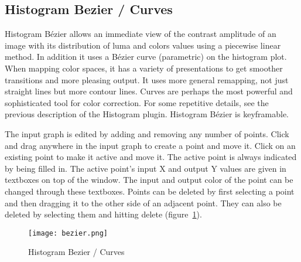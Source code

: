 \subsection{Histogram Bezier / Curves}%
\label{sub:histogram_bezier_curves}

Histogram Bézier allows an immediate view of the contrast amplitude of an image with its distribution of luma and colors values using a piecewise linear method. In addition it uses a Bézier curve (parametric) on the histogram plot. When mapping color spaces, it has a variety of presentations to get smoother transitions and more pleasing output. It uses more general remapping, not just straight lines but more contour lines. Curves are perhaps the most powerful and sophisticated tool for color correction. For some repetitive details, see the previous description of the Histogram plugin. Histogram Bézier is keyframable.

The input graph is edited by adding and removing any number of points. Click and drag anywhere in the input graph to create a point and move it. Click on an existing point to make it active and move it. The active point is always indicated by being filled in. The active point's input X and output Y values are given in textboxes on top of the window. The input and output color of the point can be changed through these textboxes. Points can be deleted by first selecting a point and then dragging it to the other side of an adjacent point. They can also be deleted by selecting them and hitting delete (figure~\ref{fig:bezier}).

\begin{figure}[htpb]
    \centering
    \texttt{[image: bezier.png]}
    \caption{Histogram Bezier / Curves}
    \label{fig:bezier}
\end{figure}

